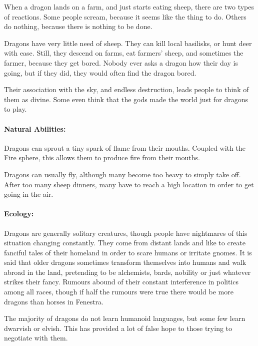 \begin{multicols}{2}

\noindent
When a dragon lands on a farm, and just starts eating sheep, there are two types of reactions.
Some people scream, because it seems like the thing to do.
Others do nothing, because there is nothing to be done.

Dragons have very little need of sheep.
They can kill local basilisks, or hunt deer with ease.
Still, they descend on farms, eat farmers' sheep, and sometimes the farmer, because they get bored.
Nobody ever asks a dragon how their day is going, but if they did, they would often find the dragon bored.

Their association with the sky, and endless destruction, leads people to think of them as divine.
Some even think that the gods made the world just for dragons to play.

\paragraph{Natural Abilities:}
Dragons can sprout a tiny spark of flame from their mouths.
Coupled with the Fire sphere, this allows them to produce fire from their mouths.

Dragons can usually fly, although many become too heavy to simply take off.
After too many sheep dinners, many have to reach a high location in order to get going in the air.

\paragraph{Ecology:} Dragons are generally solitary creatures, though people have nightmares of this situation changing constantly.
They come from distant lands and like to create fanciful tales of their homeland in order to scare humans or irritate gnomes.
It is said that older dragons sometimes transform themselves into humans and walk abroad in the land, pretending to be alchemists, bards, nobility or just whatever strikes their fancy.
Rumours abound of their constant interference in politics among all races, though if half the rumours were true there would be more dragons than horses in Fenestra.

The majority of dragons do not learn humanoid languages, but some few learn dwarvish or elvish.
This has provided a lot of false hope to those trying to negotiate with them.

\dragon

\showStdSpells


\end{multicols}
